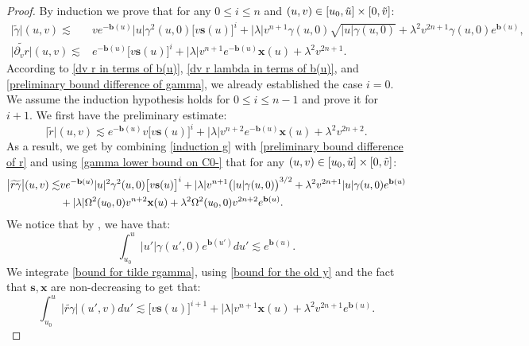 \documentclass[10pt,a4paper]{amsart}
\begin{document}
\begin{proof}
    By induction we prove that for any $0\leq i\leq n$ and $(u,v)\in[u_0,\Tilde{u}]\times[0,\Tilde{v}]$:
    \begin{align}
        \big|\widetilde{\gamma}\big|(u,v)\lesssim & ve^{-\mathbf{b}(u)}|u|\gamma^2(u,0)\big[v\mathbf{s}(u)\big]^{i}+|\lambda|v^{n+1}\gamma(u,0)\sqrt{|u|\gamma(u,0)}+\lambda^2v^{2n+1}\gamma(u,0)e^{\mathbf{b}(u)},\label{induction g}\\
        \big|\widetilde{\partial_vr}\big|(u,v)\lesssim & e^{-\mathbf{b}(u)}\big[v\mathbf{s}(u)\big]^{i}+|\lambda|v^{n+1}e^{-\mathbf{b}(u)}\mathbf{x}(u)+\lambda^2v^{2n+1}.\label{induction r}
    \end{align}
    According to \eqref{dv r in terms of b(u)}, \eqref{dv r lambda in terms of b(u)}, and \eqref{preliminary bound difference of gamma}, we already established the case $i=0$. We assume the induction hypothesis holds for $0\leq i\leq n-1$ and prove it for $i+1.$ We first have the preliminary estimate:
    \begin{equation}\label{preliminary bound difference of r}
        \big|\widetilde{r}\big|(u,v)\lesssim e^{-\mathbf{b}(u)}v\big[v\mathbf{s}(u)\big]^{i}+|\lambda| v^{n+2}e^{-\mathbf{b}(u)}\mathbf{x}(u)+\lambda^2v^{2n+2}.
    \end{equation}
    As a result, we get by combining \eqref{induction g} with \eqref{preliminary bound difference of r} and using \eqref{gamma lower bound on C0-} that for any $(u,v)\in[u_0,\Tilde{u}]\times[0,\Tilde{v}]$:
    \begin{align}\label{bound for tilde rgamma}
        \big|\widetilde{r\gamma}\big|(u,v)\lesssim & ve^{-\mathbf{b}(u)}|u|^2\gamma^2(u,0)\big[v\mathbf{s}(u)\big]^{i}+|\lambda| v^{n+1}\big(|u|\gamma(u,0)\big)^{3/2}+\lambda^2v^{2n+1}|u|\gamma(u,0)e^{\mathbf{b}(u)}\\
        & +|\lambda|\Omega^2(u_0,0) v^{n+2}\mathbf{x}(u)+\lambda^2\Omega^2(u_0,0)v^{2n+2}e^{\mathbf{b}(u)}.\notag
    \end{align}
    We notice that by , we have that:
    \begin{equation}\label{bound for the old y}
        \int_{u_0}^u|u'|\gamma(u',0)e^{\mathbf{b}(u')}du'\lesssim e^{\mathbf{b}(u)}.
    \end{equation}
    We integrate \eqref{bound for tilde rgamma}, using \eqref{bound for the old y} and the fact that $\mathbf{s},\mathbf{x}$ are non-decreasing to get that:
    \begin{equation}\label{preliminary bound difference of r gamma}
        \int_{u_0}^u\big|\widetilde{r\gamma}\big|(u',v)du'\lesssim \big[v\mathbf{s}(u)\big]^{i+1}+|\lambda| v^{n+1}\mathbf{x}(u)+\lambda^2v^{2n+1}e^{\mathbf{b}(u)}.

\end{equation}
\end{proof}
\end{document}
